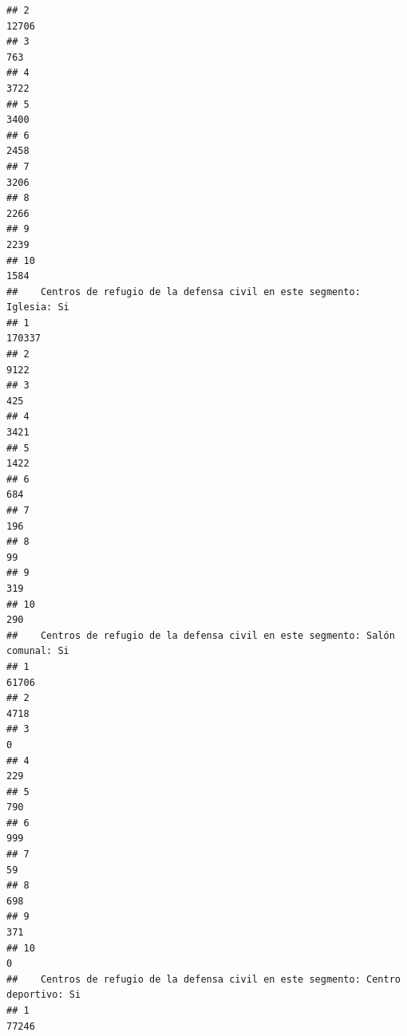 \documentclass[11pt,]{article}
\begin{document}
\begin{verbatim}
## 2                                                                         12706
## 3                                                                           763
## 4                                                                          3722
## 5                                                                          3400
## 6                                                                          2458
## 7                                                                          3206
## 8                                                                          2266
## 9                                                                          2239
## 10                                                                         1584
##    Centros de refugio de la defensa civil en este segmento: Iglesia: Si
## 1                                                                170337
## 2                                                                  9122
## 3                                                                   425
## 4                                                                  3421
## 5                                                                  1422
## 6                                                                   684
## 7                                                                   196
## 8                                                                    99
## 9                                                                   319
## 10                                                                  290
##    Centros de refugio de la defensa civil en este segmento: Salón comunal: Si
## 1                                                                       61706
## 2                                                                        4718
## 3                                                                           0
## 4                                                                         229
## 5                                                                         790
## 6                                                                         999
## 7                                                                          59
## 8                                                                         698
## 9                                                                         371
## 10                                                                          0
##    Centros de refugio de la defensa civil en este segmento: Centro deportivo: Si
## 1                                                                          77246

\end{verbatim}
\end{document}
